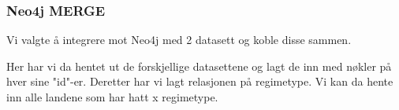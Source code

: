 \subsubsection{Neo4j MERGE}
Vi valgte å integrere mot Neo4j med 2 datasett og koble disse sammen.

Her har vi da hentet ut de forskjellige datasettene og lagt de inn med nøkler på hver sine "id"-er. Deretter har vi lagt relasjonen på regimetype. Vi kan da hente inn alle landene som har hatt x regimetype.